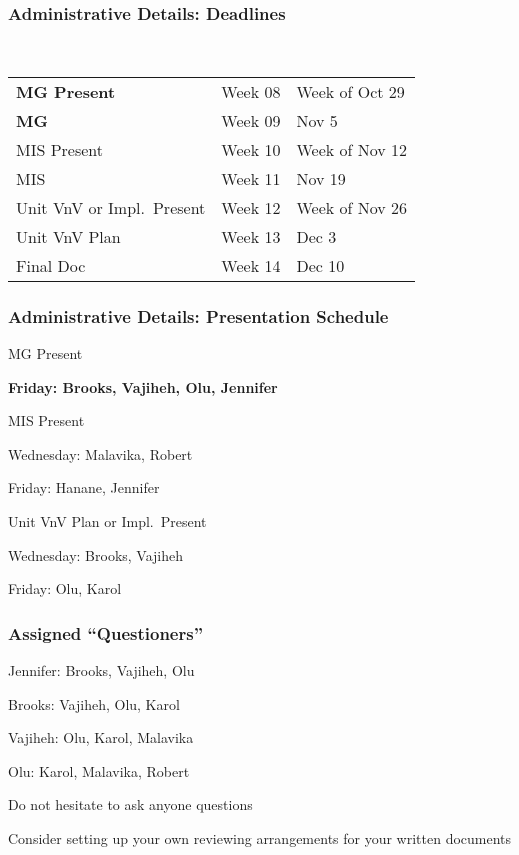 \documentclass[t,12pt,numbers,fleqn]{beamer}
\begin{document}



\begin{frame}
\frametitle{Administrative Details: Deadlines}
~\newline
\begin{tabular}{l l l}
\textbf{MG Present} & Week 08 & Week of Oct 29\\
\textbf{MG} & Week 09 & Nov 5\\
MIS Present & Week 10 & Week of Nov 12\\
MIS & Week 11 & Nov 19\\
Unit VnV or Impl.\ Present & Week 12 & Week of Nov 26\\
Unit VnV Plan & Week 13 & Dec 3\\
Final Doc & Week 14 & Dec 10\\
\end {tabular}

\end{frame}


\begin{frame}
\frametitle{Administrative Details: Presentation Schedule}

\bi
\item MG Present
\bi
\item \textbf{Friday: Brooks, Vajiheh, Olu, Jennifer}
\ei
\item MIS Present
\bi
\item Wednesday: Malavika, Robert
\item Friday: Hanane,  Jennifer
\ei
\item Unit VnV Plan or Impl.\ Present
\bi
\item Wednesday: Brooks, Vajiheh
\item Friday: Olu, Karol
\ei
\ei

\end{frame}


\begin{frame}
\frametitle{Assigned ``Questioners''}

\be
\item Jennifer: Brooks, Vajiheh, Olu
\item Brooks: Vajiheh, Olu, Karol
\item Vajiheh: Olu, Karol, Malavika
\item Olu: Karol, Malavika, Robert
\ee
\bi
\item Do not hesitate to ask anyone questions
\item Consider setting up your own reviewing arrangements for your written
  documents
\ei
\end{frame}

\end{document}
